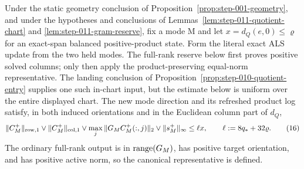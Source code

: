 \begin{proposition}\label{prop:step-011-block-contraction}
Under the static geometry conclusion of Proposition~\ref{prop:step-001-geometry},
and under the hypotheses and conclusions of
Lemmas~\ref{lem:step-011-quotient-chart} and
\ref{lem:step-011-gram-reserve}, fix a mode M and let
\(x=d_Q(e,0)\le\varrho\) for an exact-span balanced positive-product state.
Form the literal exact ALS update from the two held modes. The full-rank
reserve below first proves positive solved columns; only then apply the
product-preserving equal-norm representative. The landing conclusion of
Proposition~\ref{prop:step-010-quotient-entry}
supplies one such in-chart input, but the estimate below is uniform over
the entire displayed chart.
The new mode direction and its refreshed product log satisfy, in both
induced orientations and in the Euclidean column part of \(d_Q\),
\[
 \|C_M^+\|_{\rm row,1}\vee\|C_M^+\|_{\rm col,1}
 \vee\max_j\|G_MC_M^+(:,j)\|_2
 \vee\|s_M^+\|_\infty
 \le \ell x,
 \qquad \ell:=8q_*+32\varrho.
\tag{16}
\]
The ordinary full-rank output is in \({\rm range}(G_M)\), has positive
target orientation, and has positive active norm, so the canonical
representative is defined.


\end{proposition}
